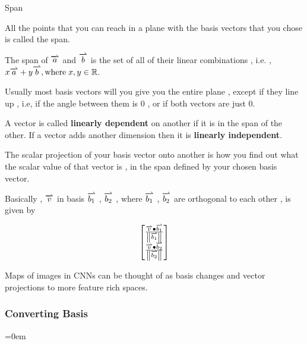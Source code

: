 \tcolorboxdefinition
{Span}
{\label{def:span}}
{

All the points that you can reach in a plane with the basis vectors that you chose is called the span.

The span of \( \harpoon{a} \) and \( \harpoon{b} \) is the set of all of their linear combinations , i.e. , \( x \harpoon{a} + y \harpoon{b} , \text{where} \; x,y \in \mathbb{R} \).

}

Usually most basis vectors will you give you the entire plane , except if they line up , i.e, if the angle between them is 0 , or if both vectors are just 0.

A vector is called \textbf {linearly dependent} on another if it is in the span of the other. If a vector adds another dimension then it is \textbf{linearly independent}.

The scalar projection of your basis vector onto another is how you find out what the scalar value of that vector is , in the span defined by your chosen basis vector.

Basically , \( \harpoon{v} \) in basis  \( \harpoon{b_1} \) , \( \harpoon{b_2} \) , where \( \harpoon{b_1} \) , \( \harpoon{b_2} \) are orthogonal to each other , is given by 

\[
\begin{aligned}
\begin{bmatrix}
\frac{\harpoon{v} \bullet \harpoon{b_1}}{\left\|\harpoon{b_1}\right\|} \\
\frac{\harpoon{v} \bullet \harpoon{b_2}}{\left\|\harpoon{b_2}\right\|}
\end{bmatrix}
\end{aligned}
\]



Maps of images in CNNs can be thought of as basis changes and vector projections to more feature rich spaces.


\subsubsection{Converting Basis}
\label{sssec:converting_basis}
\parindent=0em



